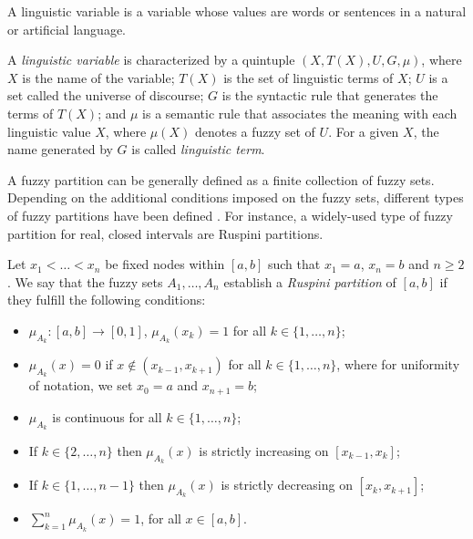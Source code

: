 A linguistic variable is a variable whose values are words or sentences in a natural or artificial language.
\begin{definition}\label{def:fuzzyvariable}
	A \emph{linguistic variable} is characterized by a quintuple \linebreak $(X,T(X),U,G,\mu)$, where $X$ is the name of the variable; $T(X)$ is the set of linguistic terms of $X$; $U$ is a set called the universe of discourse; $G$ is the syntactic rule that generates the terms of $T(X)$; and $\mu$ is a semantic rule that associates the meaning with each linguistic value $X$, where $\mu(X)$ denotes a fuzzy set of $U$. For a given $X$, the name generated by $G$ is called \emph{linguistic term}.
\end{definition}

A fuzzy partition can be generally defined as a finite collection of fuzzy sets.  Depending on the additional conditions imposed on the fuzzy sets, different types of fuzzy partitions have been defined \cite{Bezdek1978,Dumitrescu1992,Ovchinnikov1991}. For instance, a widely-used type of fuzzy partition for real, closed intervals are Ruspini partitions.

\begin{definition}
	Let $x_1 < \dots < x_n$ be fixed nodes within $[a,b]$ such that $x_1=a$, $x_n=b$ and $n \geq 2$. We say that the fuzzy sets $A_1, \dots, A_n$ establish a \emph{Ruspini partition} of $[a,b]$ if they fulfill the following conditions:
	\begin{itemize}
		\item $\mu_{A_k}: [a,b] \to [0,1]$, $\mu_{A_k}(x_k)=1$ for all $k \in \{1,\dots,n\}$;
		\item $\mu_{A_k}(x)=0$ if $x \not \in (x_{k-1},x_{k+1})$ for all $k \in \{1,\dots,n\}$, where for uniformity of notation, we set $x_0=a$ and $x_{n+1}=b$;
		\item $\mu_{A_k}$ is continuous for all $k \in \{1,\dots,n\}$;
		\item If $k \in \{2,\dots,n\}$ then $\mu_{A_k}(x)$ is strictly increasing on $[x_{k-1},x_k]$;
		\item If $k \in \{1,\dots,n-1\}$ then $\mu_{A_k}(x)$ is strictly decreasing on $[x_k,x_{k+1}]$;
		\item $\displaystyle \sum_{k=1}^n \mu_{A_k}(x)=1$, for all $x \in [a,b]$.
 	\end{itemize}
\end{definition}


